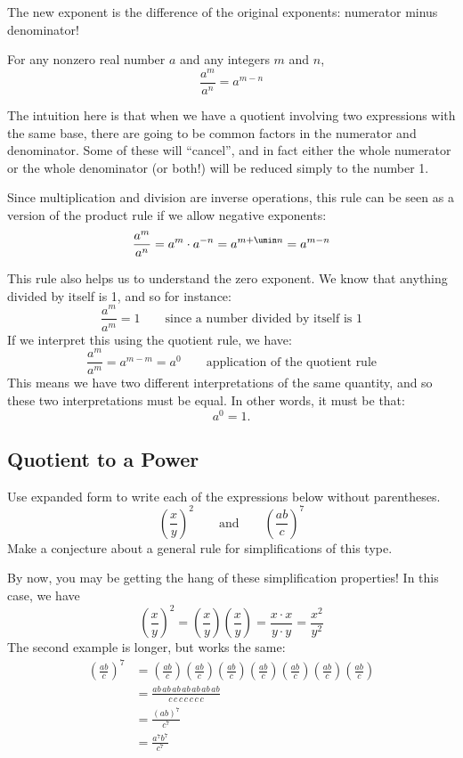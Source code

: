 The new exponent is the difference of the original exponents: numerator minus denominator!

\begin{boxeddef}
For any nonzero real number $a$ and any integers $m$ and $n$, \[\frac{a^m}{a^n} = a^{m-n}\]
\end{boxeddef}

The intuition here is that when we have a quotient involving two expressions with the same base, there are going to be common factors in the numerator and denominator. Some of these will ``cancel'', and in fact either the whole numerator or the whole denominator (or both!) will be reduced simply to the number 1.

Since multiplication and division are inverse operations, this rule can be seen as a version of the product rule if we allow negative exponents:
\[\frac{a^m}{a^n} = a^m \cdot a^{-n} = a^{m+\umin n} = a^{m-n}\]

This rule also helps us to understand the zero exponent. We know that anything divided by itself is 1, and so for instance: \[\frac{a^m}{a^m} = 1 \qquad\text{since a number divided by itself is 1}\]
If we interpret this using the quotient rule, we have: \[\frac{a^m}{a^m} = a^{m-m} = a^0 \qquad\text{application of the quotient rule}\]
This means we have two different interpretations of the same quantity, and so these two interpretations must be equal. In other words, it must be that: \[a^0 = 1.\]


\subsection{Quotient to a Power}

\begin{boxedexplore}
Use expanded form to write each of the expressions below without parentheses.
\[\left(\frac{x}{y}\right)^2 \qquad\text{and}\qquad \left(\frac{ab}{c}\right)^7\]
Make a conjecture about a general rule for simplifications of this type.
\end{boxedexplore}

By now, you may be getting the hang of these simplification properties! In this case, we have
\[\left(\frac{x}{y}\right)^2 = \left(\frac{x}{y}\right)\left(\frac{x}{y}\right) = \frac{x\cdot x}{y\cdot y} = \frac{x^2}{y^2}\]
The second example is longer, but works the same:
\[\begin{aligned}
\left(\frac{ab}{c}\right)^7
&= \left(\frac{ab}{c}\right)\left(\frac{ab}{c}\right)\left(\frac{ab}{c}\right)\left(\frac{ab}{c}\right)\left(\frac{ab}{c}\right)\left(\frac{ab}{c}\right)\left(\frac{ab}{c}\right)
\\[1ex]&= \frac{ab\,ab\,ab\,ab\,ab\,ab\,ab}{c\,c\,c\,c\,c\,c\,c}
\\[1ex]&= \frac{(ab)^7}{c^7}
\\[1ex]&= \frac{a^7b^7}{c^7}
\end{aligned}\]

